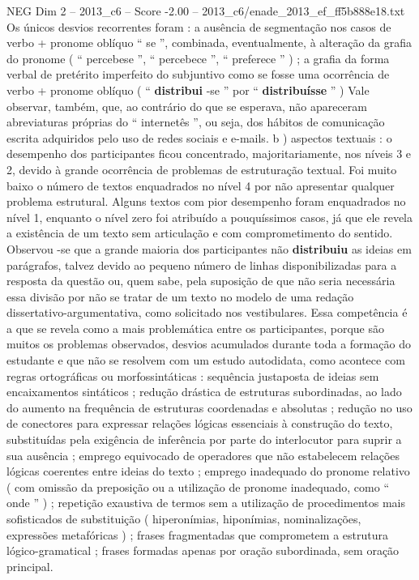 \begin{textsample}{NEG Dim 2 – 2013\_c6 – Score -2.00 – 2013\_c6/enade\_2013\_ef\_ff5b888e18.txt}
Os únicos desvios recorrentes foram : a ausência de segmentação nos casos de verbo + pronome oblíquo “ se ”, combinada, eventualmente, à alteração da grafia do pronome ( “ percebese ”, “ percebece ”, “ preferece ” ) ; a grafia da forma verbal de pretérito imperfeito do subjuntivo como se fosse uma ocorrência de verbo + pronome oblíquo ( “ \textbf{distribui} -se ” por “ \textbf{distribuísse} ” ) Vale observar, também, que, ao contrário do que se esperava, não apareceram abreviaturas próprias do “ internetês ”, ou seja, dos hábitos de comunicação escrita adquiridos pelo uso de redes sociais e e-mails. b ) aspectos textuais : o desempenho dos participantes ficou concentrado, majoritariamente, nos níveis 3 e 2, devido à grande ocorrência de problemas de estruturação textual.
Foi muito baixo o número de textos enquadrados no nível 4 por não apresentar qualquer problema estrutural.
Alguns textos com pior desempenho foram enquadrados no nível 1, enquanto o nível zero foi atribuído a pouquíssimos casos, já que ele revela a existência de um texto sem articulação e com comprometimento do sentido.
Observou -se que a grande maioria dos participantes não \textbf{distribuiu} as ideias em parágrafos, talvez devido ao pequeno número de linhas disponibilizadas para a resposta da questão ou, quem sabe, pela suposição de que não seria necessária essa divisão por não se tratar de um texto no modelo de uma redação dissertativo-argumentativa, como solicitado nos vestibulares.
Essa competência é a que se revela como a mais problemática entre os participantes, porque são muitos os problemas observados, desvios acumulados durante toda a formação do estudante e que não se resolvem com um estudo autodidata, como acontece com regras ortográficas ou morfossintáticas : sequência justaposta de ideias sem encaixamentos sintáticos ; redução drástica de estruturas subordinadas, ao lado do aumento na frequência de estruturas coordenadas e absolutas ; redução no uso de conectores para expressar relações lógicas essenciais à construção do texto, substituídas pela exigência de inferência por parte do interlocutor para suprir a sua ausência ; emprego equivocado de operadores que não estabelecem relações lógicas coerentes entre ideias do texto ; emprego inadequado do pronome relativo ( com omissão da preposição ou a utilização de pronome inadequado, como “ onde ” ) ; repetição exaustiva de termos sem a utilização de procedimentos mais sofisticados de substituição ( hiperonímias, hiponímias, nominalizações, expressões metafóricas ) ; frases fragmentadas que comprometem a estrutura lógico-gramatical ; frases formadas apenas por oração subordinada, sem oração principal.

\end{textsample}
